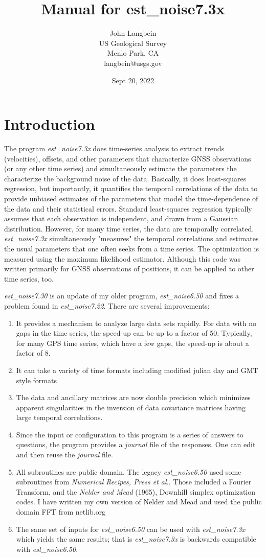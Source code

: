 \documentclass[12pt]{amsart}
\title{Manual for est\_noise7.3x}
\author{John Langbein \\
US Geological Survey \\
Menlo Park, CA \\
langbein@usgs.gov}
\date{Sept 20, 2022}                                        %
\begin{document}
\maketitle
\section{Introduction}

The program \textit{est\_noise7.3x} does time-series analysis to extract trends (velocities), offsets, and other
parameters that characterize GNSS observations (or any other time series) and simultaneously estimate the parameters the characterize the background noise
of the data. Basically, it does least-squares regression, but importantly, it quantifies the temporal correlations of the data to
provide unbiased estimates of the parameters that model the time-dependence of the data and their statistical errors. Standard least-squares regression typically assumes that each observation is independent, and drawn from a Gaussian distribution. However, for many time series, the data are temporally correlated.  \textit{est\_noise7.3x} simultaneously "measures" the temporal correlations and estimates the usual parameters that one often seeks from a time series.
The optimization is measured using the maximum likelihood estimator.  Although this code was written primarily for
GNSS observations of positions, it can be applied to other time series, too.

\textit{est\_noise7.30} is an update of my older program, \textit{est\_noise6.50} and fixes a problem found in \textit{est\_noise7.22}.  There are several improvements:
\begin{enumerate}
\item {It provides a mechanism to analyze large data sets rapidly. For data with no gaps in the time series, the speed-up
can be up to a factor of 50. Typically, for many GPS time series, which have a few gaps, the speed-up is about a factor of 8.}
\item {It can take a variety of time formats including modified julian day and GMT style formats}
\item {The data and ancillary matrices are now double precision which minimizes apparent singularities in the inversion of data
covariance matrices having large temporal correlations.}
\item {Since the input or configuration to this program is a series of answers to questions, the program provides a
\textit{journal} file of the responses.  One can edit and then reuse the \textit{journal} file.}
\item {All subroutines are public domain. The legacy \textit{est\_noise6.50} used some subroutines from \textit{Numerical Recipes, Press et al.}. Those included a Fourier Transform, and the  \textit{Nelder and Mead} (1965), Downhill simplex optimization codes.
I have written my own version of Nelder and Mead and used the public domain FFT from netlib.org}
\item {The same set of inputs for \textit{est\_noise6.50} can be used with \textit{est\_noise7.3x} which yields the same
results; that is  \textit{est\_noise7.3x} is backwards compatible with  \textit{est\_noise6.50}.}
\end{enumerate}
\end{document}
